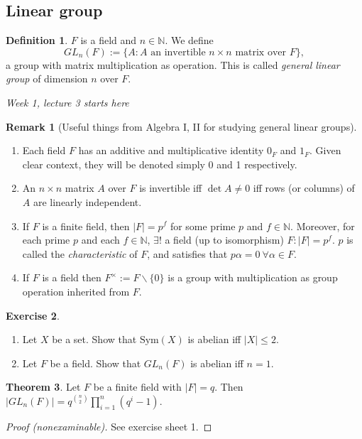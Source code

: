 \documentclass[a4paper]{article}
\newcommand{\Sym}{\text{Sym}}
\theoremstyle{definition}
\newtheorem{defn}{Definition}[subsection]
\newtheorem{thm}[defn]{Theorem}
\newtheorem{exe}[defn]{Exercise}
\newtheorem*{remark}{Remark}
\begin{document}
\subsection{Linear group}
\begin{defn}
$F$ is a field and $n\in \mathbb N$. We define
\[
GL_n(F) := \{A:A\text{ an invertible }n\times n \text{ matrix over } F\},
\]
a group with matrix multiplication as operation. This is called \textit{general linear group} of dimension $n$ over $F$.
\end{defn}
\begin{flushright}
\textit{Week 1, lecture 3 starts here}
\end{flushright}

\begin{remark}[Useful things from Algebra I, II for studying general linear groups]
\begin{enumerate}
\item Each field $F$ has an additive and multiplicative identity $0_F$ and $1_F$. Given clear context, they will be denoted simply 0 and 1 respectively.
\item An $n\times n$ matrix $A$ over $F$ is invertible iff $\det A\neq 0$ iff rows (or columns) of $A$ are linearly independent.
\item If $F$ is a finite field, then $|F|=p^f$ for some prime $p$ and $f\in\mathbb N$. Moreover, for each prime $p$ and each $f\in\mathbb N$, $\exists!$ a field (up to isomorphism) $F:|F|=p^f$. $p$ is called the \textit{characteristic} of $F$, and satisfies that $p\alpha=0 \ \forall \alpha\in F$.
\item If $F$ is a field then $F^{\times}:=F\backslash \{0\}$ is a group with multiplication as group operation inherited from $F$.
\end{enumerate}
\end{remark}
\begin{exe}
\begin{enumerate}
\item Let $X$ be a set. Show that $\Sym(X)$ is abelian iff $|X|\leq 2$.
\item Let $F$ be a field. Show that $GL_n(F)$ is abelian iff $n=1$.
\end{enumerate}
\end{exe}
\begin{thm}
Let $F$ be a finite field with $|F|=q$. Then $\displaystyle |GL_n(F)|=q^{\binom{n}{2}} \prod_{i=1}^n (q^i-1)$.
\end{thm}
\begin{proof}[Proof (nonexaminable)]
See exercise sheet 1. 
\end{proof}
\end{document}
